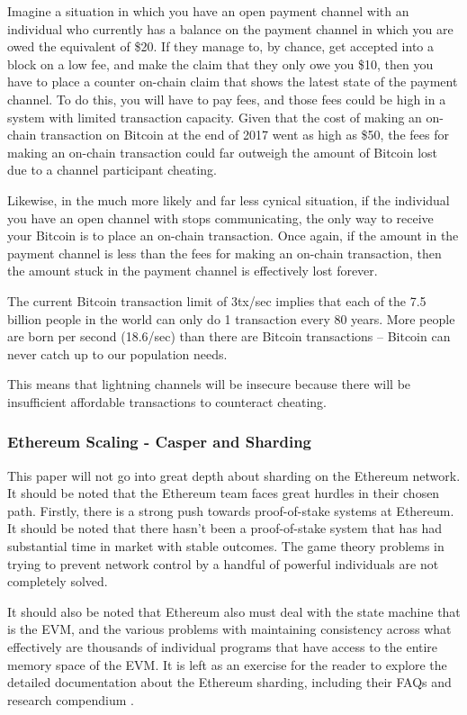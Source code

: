 \documentclass[a4paper,12pt]{article}
\begin{document}
Imagine a situation in which you have an open payment channel with an individual who currently has a balance on the payment channel in which you are owed the equivalent of \$20. If they manage to, by chance, get accepted into a block on a low fee, and make the claim that they only owe you \$10, then you have to place a counter on-chain claim that shows the latest state of the payment channel. To do this, you will have to pay fees, and those fees could be high in a system with limited transaction capacity. Given that the cost of making an on-chain transaction on Bitcoin at the end of 2017 went as high as \$50, the fees for making an on-chain transaction could far outweigh the amount of Bitcoin lost due to a channel participant cheating. 

Likewise, in the much more likely and far less cynical situation, if the individual you have an open channel with stops communicating, the only way to receive your Bitcoin is to place an on-chain transaction. Once again, if the amount in the payment channel is less than the fees for making an on-chain transaction, then the amount stuck in the payment channel is effectively lost forever.

The current Bitcoin transaction limit of 3tx/sec implies that each of the 7.5 billion people in the world can only do 1 transaction every 80 years. More people are born per second (18.6/sec) than there are Bitcoin transactions – Bitcoin can never catch up to our population needs.

This means that lightning channels will be insecure because there will be insufficient affordable transactions to counteract cheating.


\subsubsection{Ethereum Scaling - Casper and Sharding}
This paper will not go into great depth about sharding on the Ethereum network. It should be noted that the Ethereum team faces great hurdles in their chosen path. Firstly, there is a strong push towards proof-of-stake systems at Ethereum. It should be noted that there hasn't been a proof-of-stake system that has had substantial time in market with stable outcomes. The game theory problems in trying to prevent network control by a handful of powerful individuals are not completely solved.

It should also be noted that Ethereum also must deal with the state machine that is the EVM, and the various problems with maintaining consistency across what effectively are thousands of individual programs that have access to the entire memory space of the EVM. It is left as an exercise for the reader to explore the detailed documentation about the Ethereum sharding, including their FAQs \cite{ethereumshardingFaqs} and research compendium \cite{ethereumResearchCompendium}.
\end{document}
